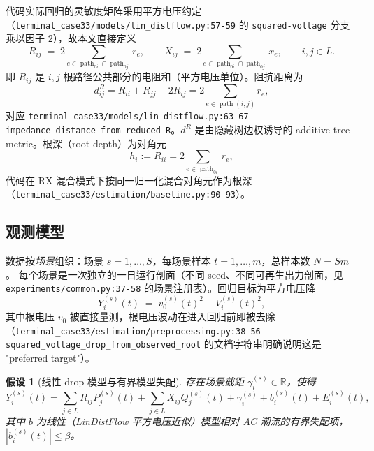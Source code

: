 \documentclass[UTF8,11pt]{ctexart}
\newtheorem{assumption}{假设}
\begin{document}
代码实际回归的灵敏度矩阵采用平方电压约定
（\texttt{terminal\_case33/models/lin\_distflow.py:57-59} 的 \texttt{squared-voltage} 分支
乘以因子 $2$），故本文直接定义
\begin{equation}
  R_{ij} \;=\; 2\sum_{e\in \operatorname{path}_{0i}\cap \operatorname{path}_{0j}} r_e,
  \qquad
  X_{ij} \;=\; 2\sum_{e\in \operatorname{path}_{0i}\cap \operatorname{path}_{0j}} x_e,
  \qquad i,j\in L.
  \label{eq:shared-path-R}
\end{equation}
即 $R_{ij}$ 是 $i,j$ 根路径公共部分的电阻和（平方电压单位）。阻抗距离为
\begin{equation}
  d^R_{ij}=R_{ii}+R_{jj}-2R_{ij}
  =2\sum_{e\in \operatorname{path}(i,j)} r_e,
  \label{eq:impedance-distance}
\end{equation}
对应 \texttt{terminal\_case33/models/lin\_distflow.py:63-67}
\texttt{impedance\_distance\_from\_reduced\_R}。$d^R$ 是由隐藏树边权诱导的
additive tree metric。根深（root depth）为对角元
\begin{equation}
  h_i := R_{ii} = 2\sum_{e\in \operatorname{path}_{0i}} r_e,
  \label{eq:root-depth}
\end{equation}
代码在 RX 混合模式下按同一归一化混合对角元作为根深
（\texttt{terminal\_case33/estimation/baseline.py:90-93}）。

\subsection{观测模型}

数据按\emph{场景}组织：场景 $s=1,\ldots,S$，每场景样本 $t=1,\ldots,m$，总样本数 $N=Sm$。
每个场景是一次独立的一日运行剖面（不同 seed、不同可再生出力剖面，见
\texttt{experiments/common.py:37-58} 的场景注册表）。回归目标为平方电压降
\begin{equation}
  Y_i^{(s)}(t) \;=\; v_0^{(s)}(t)^2 - V_i^{(s)}(t)^2,
  \label{eq:drop-target}
\end{equation}
其中根电压 $v_0$ 被直接量测，根电压波动在进入回归前即被去除
（\texttt{terminal\_case33/estimation/preprocessing.py:38-56}
\texttt{squared\_voltage\_drop\_from\_observed\_root} 的文档字符串明确说明这是
"preferred target"）。

\begin{assumption}[线性 drop 模型与有界模型失配]
\label{ass:linear}
存在场景截距 $\gamma_i^{(s)}\in\mathbb{R}$，使得
\begin{equation}
  Y_i^{(s)}(t)
  =
  \sum_{j\in L} R_{ij} P_j^{(s)}(t)
  +
  \sum_{j\in L} X_{ij} Q_j^{(s)}(t)
  +
  \gamma_i^{(s)}
  +
  b_i^{(s)}(t)
  +
  E_i^{(s)}(t),
  \label{eq:linear-model}
\end{equation}
其中 $b$ 为线性（LinDistFlow 平方电压近似）模型相对 AC 潮流的有界失配项，
$|b_i^{(s)}(t)|\le \beta$。
\end{assumption}
\end{document}
